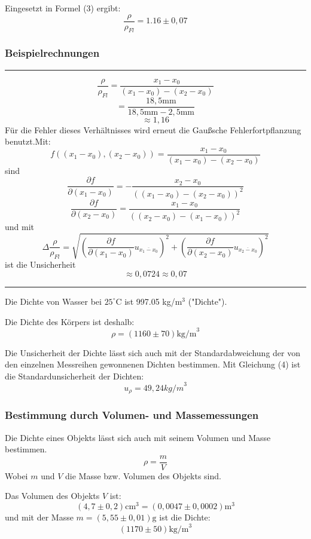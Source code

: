 \documentclass[11pt,a4paper]{article} %
\begin{document}
Eingesetzt in Formel (3) ergibt:
$$\frac{\rho}{\rho_{Fl}} = 1.16 \pm0,07$$

\subsubsection{Beispielrechnungen}
\hrule
\begin{tcolorbox}[colback=white]
$$\frac{\rho}{\rho_{Fl}} = \frac{x_1-x_0}{(x_1-x_0)-(x_2-x_0)}$$
$$=\frac{18,5\textrm{mm}}{18,5\textrm{mm}-2,5\textrm{mm}}$$
$$\approx1,16$$
Für die Fehler dieses Verhältnisses wird erneut die Gaußsche Fehlerfortpflanzung benutzt.Mit:
$$f((x_1-x_0),(x_2-x_0))=\frac{x_1-x_0}{(x_1-x_0)-(x_2-x_0)}$$
sind
$$\frac{\partial f}{\partial (x_1-x_0)}=-\dfrac{x_2-x_0}{\left((x_1-x_0)-(x_2-x_0)\right)^2}$$
$$\frac{\partial f}{\partial (x_2-x_0)}=\dfrac{x_1-x_0}{\left((x_2-x_0)-(x_1-x_0)\right)^2}$$
und mit
$$\Delta{\frac{\rho}{\rho_{Fl}}}=\sqrt{(\frac{\partial f}{\partial (x_1-x_0)}u_{\overline{x_1-x_0}})^2+(\frac{\partial f}{\partial (x_2-x_0)}u_{\overline{x_2-x_0}})^2}$$
ist die Unsicherheit
$$\approx0,0724\approx0,07$$
\end{tcolorbox}
\hrule
\vspace{5mm}

Die Dichte von Wasser bei $25^\circ$C ist 997.05 kg/m$^3$ ("Dichte").

Die Dichte des Körpers ist deshalb:
$$\rho=(1160\pm70) \textrm{kg/m}^3$$

Die Unsicherheit der Dichte lässt sich auch mit der Standardabweichung der von den einzelnen Messreihen gewonnenen Dichten bestimmen.
Mit Gleichung (4) ist die Standardunsicherheit der Dichten:
$$u_\rho=49,24{kg/m}^3$$





\subsubsection{Bestimmung durch Volumen- und Massemessungen}

Die Dichte eines Objekts lässt sich auch mit seinem Volumen und Masse bestimmen. 
\begin{equation}
\rho=\frac{m}{V}
\end{equation}
Wobei $m$ und $V$ die Masse bzw. Volumen des Objekts sind. 

Das Volumen des Objekts $V$ ist:
$$(4,7\pm0,2) \textrm{cm}^3 = (0,0047 \pm 0,0002) \textrm{m}^3$$
und mit der Masse $m=(5,55\pm0,01)\textrm{g}$ ist die Dichte:
$$(1170 \pm 50) \textrm{kg/m}^3$$
\end{document}
